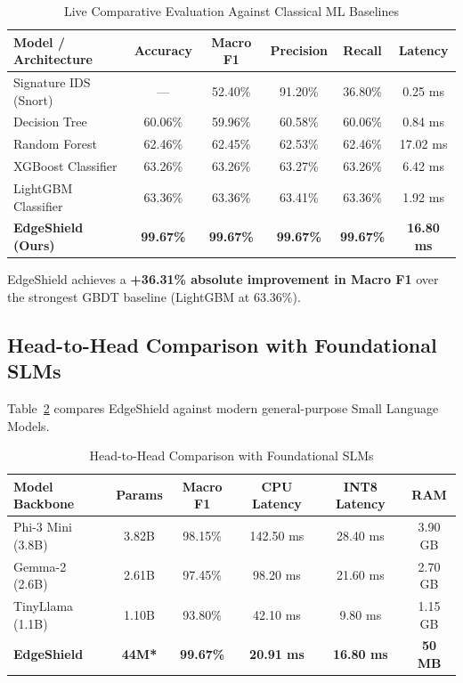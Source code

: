 \documentclass[10pt,journal,compsoc]{IEEEtran}
\begin{document}
\begin{table}[htbp]
\caption{Live Comparative Evaluation Against Classical ML Baselines}
\label{tab:baselines}
\centering
\begin{tabular}{lccccc}
\toprule
\textbf{Model / Architecture} & \textbf{Accuracy} & \textbf{Macro F1} & \textbf{Precision} & \textbf{Recall} & \textbf{Latency} \\
\midrule
Signature IDS (Snort)   & ---     & 52.40\% & 91.20\% & 36.80\% & 0.25 ms \\
Decision Tree           & 60.06\% & 59.96\% & 60.58\% & 60.06\% & 0.84 ms \\
Random Forest           & 62.46\% & 62.45\% & 62.53\% & 62.46\% & 17.02 ms \\
XGBoost Classifier      & 63.26\% & 63.26\% & 63.27\% & 63.26\% & 6.42 ms \\
LightGBM Classifier     & 63.36\% & 63.36\% & 63.41\% & 63.36\% & 1.92 ms \\
\midrule
\textbf{EdgeShield (Ours)} & \textbf{99.67\%} & \textbf{99.67\%} & \textbf{99.67\%} & \textbf{99.67\%} & \textbf{16.80 ms} \\
\bottomrule
\end{tabular}
\end{table}

EdgeShield achieves a \textbf{+36.31\% absolute improvement in Macro F1} over the strongest GBDT baseline (LightGBM at 63.36\%).

\subsection{Head-to-Head Comparison with Foundational SLMs}
Table~\ref{tab:slm_comparison} compares EdgeShield against modern general-purpose Small Language Models.

\begin{table}[htbp]
\caption{Head-to-Head Comparison with Foundational SLMs}
\label{tab:slm_comparison}
\centering
\begin{tabular}{lccccc}
\toprule
\textbf{Model Backbone} & \textbf{Params} & \textbf{Macro F1} & \textbf{CPU Latency} & \textbf{INT8 Latency} & \textbf{RAM} \\
\midrule
Phi-3 Mini (3.8B)  & 3.82B & 98.15\% & 142.50 ms & 28.40 ms & 3.90 GB \\
Gemma-2 (2.6B)     & 2.61B & 97.45\% & 98.20 ms  & 21.60 ms & 2.70 GB \\
TinyLlama (1.1B)   & 1.10B & 93.80\% & 42.10 ms  & 9.80 ms  & 1.15 GB \\
\midrule
\textbf{EdgeShield}& \textbf{44M*} & \textbf{99.67\%} & \textbf{20.91 ms} & \textbf{16.80 ms} & \textbf{50 MB} \\
\bottomrule
\end{tabular}
\end{table}
\end{document}
